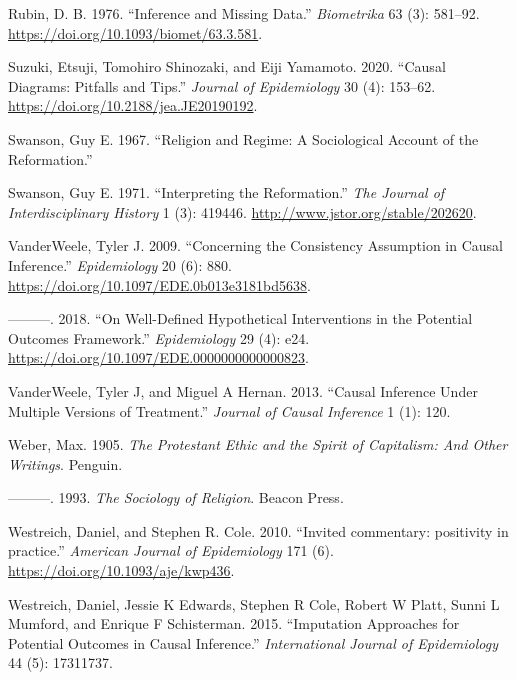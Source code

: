 \documentclass[
  singlecolumn]{report}
\newlength{\cslhangindent}
\newlength{\cslentryspacingunit} %
\newenvironment{CSLReferences}[2] %
 {%
  \setlength{\parindent}{0pt}
  \ifodd #1
  \let\oldpar\par
  \def\par{\hangindent=\cslhangindent\oldpar}
  \fi
  \setlength{\parskip}{#2\cslentryspacingunit}
 }%
 {}
\begin{document}
\begin{CSLReferences}{1}{0}
\leavevmode{}%
Rubin, D. B. 1976. {``Inference and Missing Data.''} \emph{Biometrika}
63 (3): 581--92. \url{https://doi.org/10.1093/biomet/63.3.581}.

\leavevmode{}%
Suzuki, Etsuji, Tomohiro Shinozaki, and Eiji Yamamoto. 2020. {``Causal
Diagrams: Pitfalls and Tips.''} \emph{Journal of Epidemiology} 30 (4):
153--62. \url{https://doi.org/10.2188/jea.JE20190192}.

\leavevmode{}%
Swanson, Guy E. 1967. {``Religion and Regime: A Sociological Account of
the Reformation.''}

\leavevmode{}%
Swanson, Guy E. 1971. {``Interpreting the Reformation.''} \emph{The
Journal of Interdisciplinary History} 1 (3): 419446.
\url{http://www.jstor.org/stable/202620}.

\leavevmode{}%
VanderWeele, Tyler J. 2009. {``Concerning the Consistency Assumption in
Causal Inference.''} \emph{Epidemiology} 20 (6): 880.
\url{https://doi.org/10.1097/EDE.0b013e3181bd5638}.

\leavevmode{}%
---------. 2018. {``On Well-Defined Hypothetical Interventions in the
Potential Outcomes Framework.''} \emph{Epidemiology} 29 (4): e24.
\url{https://doi.org/10.1097/EDE.0000000000000823}.

\leavevmode{}%
VanderWeele, Tyler J, and Miguel A Hernan. 2013. {``Causal Inference
Under Multiple Versions of Treatment.''} \emph{Journal of Causal
Inference} 1 (1): 120.

\leavevmode{}%
Weber, Max. 1905. \emph{The Protestant Ethic and the Spirit of
Capitalism: And Other Writings}. Penguin.

\leavevmode{}%
---------. 1993. \emph{The Sociology of Religion}. Beacon Press.

\leavevmode{}%
Westreich, Daniel, and Stephen R. Cole. 2010. {``Invited commentary:
positivity in practice.''} \emph{American Journal of Epidemiology} 171
(6). \url{https://doi.org/10.1093/aje/kwp436}.

\leavevmode{}%
Westreich, Daniel, Jessie K Edwards, Stephen R Cole, Robert W Platt,
Sunni L Mumford, and Enrique F Schisterman. 2015. {``Imputation
Approaches for Potential Outcomes in Causal Inference.''}
\emph{International Journal of Epidemiology} 44 (5): 17311737.


\end{CSLReferences}
\end{document}
